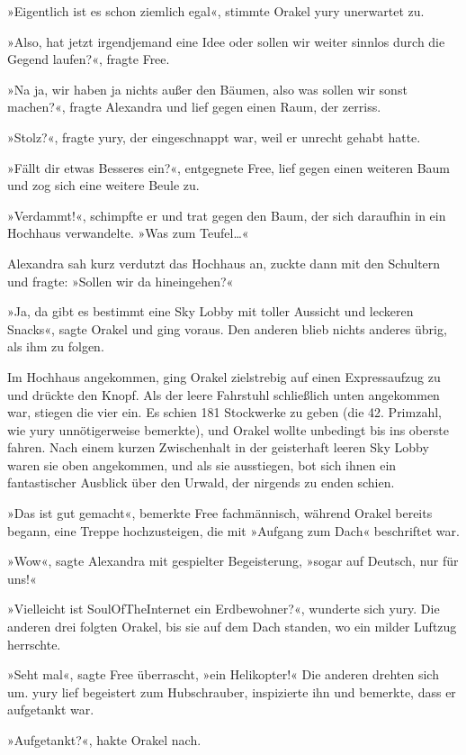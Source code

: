 »Eigentlich ist es schon ziemlich egal«, stimmte Orakel yury unerwartet zu.

»Also, hat jetzt irgendjemand eine Idee oder sollen wir weiter sinnlos durch die Gegend laufen?«, fragte Free.

»Na ja, wir haben ja nichts außer den Bäumen, also was sollen wir sonst machen?«, fragte Alexandra und lief gegen einen Raum, der zerriss.

»Stolz?«, fragte yury, der eingeschnappt war, weil er unrecht gehabt hatte.

»Fällt dir etwas Besseres ein?«, entgegnete Free, lief gegen einen weiteren Baum und zog sich eine weitere Beule zu.

»Verdammt!«, schimpfte er und trat gegen den Baum, der sich daraufhin in ein Hochhaus verwandelte. »Was zum Teufel…«

Alexandra sah kurz verdutzt das Hochhaus an, zuckte dann mit den Schultern und fragte: »Sollen wir da hineingehen?«

»Ja, da gibt es bestimmt eine Sky Lobby mit toller Aussicht und leckeren Snacks«, sagte Orakel und ging voraus. Den anderen blieb nichts anderes übrig, als ihm zu folgen.

Im Hochhaus angekommen, ging Orakel zielstrebig auf einen Expressaufzug zu und drückte den Knopf. Als der leere Fahrstuhl schließlich unten angekommen war, stiegen die vier ein. Es schien 181 Stockwerke zu geben (die 42. Primzahl, wie yury unnötigerweise bemerkte), und Orakel wollte unbedingt bis ins oberste fahren. Nach einem kurzen Zwischenhalt in der geisterhaft leeren Sky Lobby waren sie oben angekommen, und als sie ausstiegen, bot sich ihnen ein fantastischer Ausblick über den Urwald, der nirgends zu enden schien.

»Das ist gut gemacht«, bemerkte Free fachmännisch, während Orakel bereits begann, eine Treppe hochzusteigen, die mit »Aufgang zum Dach« beschriftet war.

»Wow«, sagte Alexandra mit gespielter Begeisterung, »sogar auf Deutsch, nur für uns!«

»Vielleicht ist SoulOfTheInternet ein Erdbewohner?«, wunderte sich yury. Die anderen drei folgten Orakel, bis sie auf dem Dach standen, wo ein milder Luftzug herrschte.

»Seht mal«, sagte Free überrascht, »ein Helikopter!« Die anderen drehten sich um. yury lief begeistert zum Hubschrauber, inspizierte ihn und bemerkte, dass er aufgetankt war.

»Aufgetankt?«, hakte Orakel nach.

